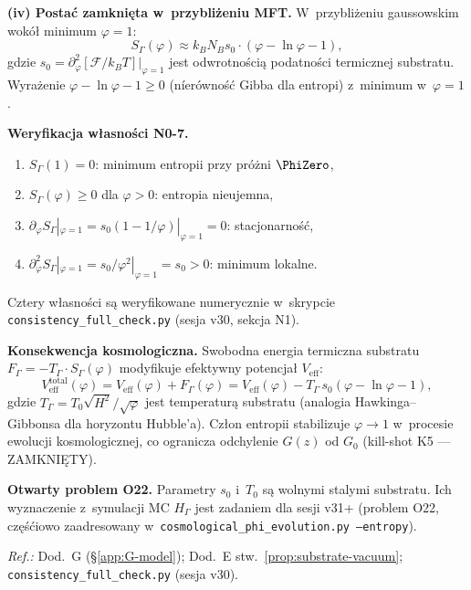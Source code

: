 \begin{chain}
\textbf{(iv) Posta\'c zamkni\k{e}ta w~przybli\.zeniu MFT.}
W~przybli\.zeniu gaussowskim wok\'o\l{} minimum $\varphi = 1$:
\begin{equation}\label{eq:S-mft-gauss}
  S_\Gamma(\varphi)
  \approx k_B N_B s_0 \cdot (\varphi - \ln\varphi - 1),
\end{equation}
gdzie $s_0 = \partial^2_\varphi[\mathcal{F}/k_BT]|_{\varphi=1}$
jest odwrotno\'sci\k{a} podatno\'sci termicznej substratu.
Wyra\.zenie $\varphi - \ln\varphi - 1 \geq 0$ (n\'ier\'owno\'s\'c
Gibba dla entropi) z~minimum w~$\varphi = 1$.

\medskip\noindent\textbf{Weryfikacja w\l{}asno\'sci N0-7.}
\begin{enumerate}[nosep,label=(\alph*)]
  \item $S_\Gamma(1) = 0$: minimum entropii przy pr\'o\.zni $\PhiZero$,
  \item $S_\Gamma(\varphi) \geq 0$ dla $\varphi > 0$: entropia nieujemna,
  \item $\partial_\varphi S_\Gamma|_{\varphi=1} = s_0(1-1/\varphi)|_{\varphi=1} = 0$:
        stacjonarno\'s\'c,
  \item $\partial^2_\varphi S_\Gamma|_{\varphi=1} = s_0/\varphi^2|_{\varphi=1} = s_0 > 0$:
        minimum lokalne.
\end{enumerate}
Cztery w\l{}asno\'sci s\k{a} weryfikowane numerycznie w~skrypcie
\texttt{consistency\_full\_check.py} (sesja v30, sekcja N1).

\medskip\noindent\textbf{Konsekwencja kosmologiczna.}
Swobodna energia termiczna substratu
$F_\Gamma = -T_\Gamma \cdot S_\Gamma(\varphi)$
modyfikuje efektywny potencja\l{} $V_{\mathrm{eff}}$:
\begin{equation}\label{eq:Veff-with-entropy}
  V_{\mathrm{eff}}^{\mathrm{total}}(\varphi)
  = V_{\mathrm{eff}}(\varphi) + F_\Gamma(\varphi)
  = V_{\mathrm{eff}}(\varphi) - T_\Gamma\,s_0(\varphi - \ln\varphi - 1),
\end{equation}
gdzie $T_\Gamma = T_0\sqrt{H^2}/\sqrt{\varphi}$ jest temperatur\k{a}
substratu (analogia Hawkinga--Gibbonsa dla horyzontu Hubble'a).
Cz\l{}on entropii stabilizuje $\varphi \to 1$ w~procesie ewolucji
kosmologicznej, co ogranicza odchylenie $G(z)$ od $G_0$
(kill-shot K5 --- ZAMKNI\k{E}TY).

\medskip\noindent\textbf{Otwarty problem O22.}
Parametry $s_0$ i~$T_0$ s\k{a} wolnymi stalymi substratu.
Ich wyznaczenie z~symulacji MC $H_\Gamma$ jest zadaniem
dla sesji v31+ (problem O22, cz\k{e}\'s\'ciowo zaadresowany
w~\texttt{cosmological\_phi\_evolution.py --entropy}).

\emph{Ref.:} Dod.~G (\S\ref{app:G-model}); Dod.~E stw.~\ref{prop:substrate-vacuum};
\texttt{consistency\_full\_check.py} (sesja v30).
\end{chain}

